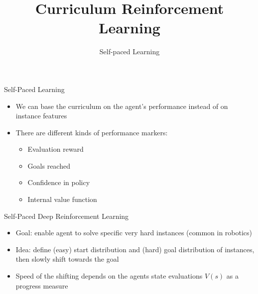 


\title[Curriculum RL]{Curriculum Reinforcement Learning}
\subtitle{Self-paced Learning}



	
	\maketitle

\begin{frame}[c]{Self-Paced Learning}
	
	\begin{itemize}
		\item We can base the curriculum on the agent's performance instead of on instance features
		\item There are different kinds of performance markers:
		\pause
		\begin{itemize}
			\item Evaluation reward
			\item Goals reached
			\item Confidence in policy
			\item Internal value function
		\end{itemize}
	\end{itemize}
	
\end{frame}

\begin{frame}[c]{Self-Paced Deep Reinforcement Learning~}
	
	\begin{itemize}
		\item Goal: enable agent to solve specific very hard instances (common in robotics)
		\item Idea: define (easy) start distribution and (hard) goal distribution of instances, then slowly shift towards the goal
		\item Speed of the shifting depends on the agents state evaluations $V(s)$ as a progress measure
	\end{itemize}
	
\end{frame}

